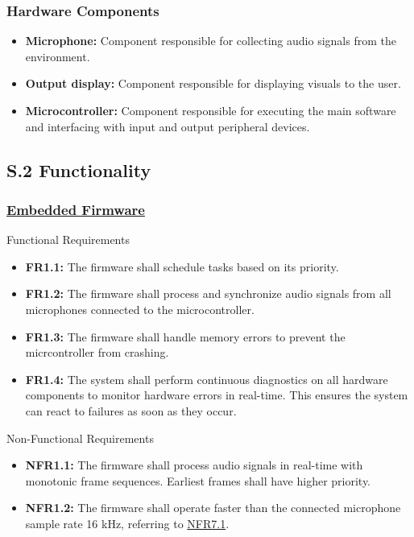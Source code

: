 \documentclass[12pt]{article}
\theoremstyle{definition}
\begin{document}
\subsubsection{Hardware Components}

\begin{itemize}
  \item \textbf{Microphone:}\label{comp:microphone} Component responsible for
  collecting audio signals from the environment.

  \item \textbf{Output display:}\label{comp:display} Component responsible for
  displaying visuals to the user.

  \item \textbf{Microcontroller:} \label{comp:microcontroller} Component
  responsible for executing the main software and interfacing with input and
  output peripheral devices.
\end{itemize}

\subsection{S.2 Functionality} \label{sec:S.2}

\subsubsection{\hyperref[comp:embedded_firmware]{Embedded Firmware}} Functional
Requirements \label{sec:FR1}
\begin{itemize}
  \item \label{FR1_1}\textbf{FR1.1:} The firmware shall schedule tasks based on
  its priority.
  
  \item \label{FR1_2}\textbf{FR1.2:} The firmware shall process and synchronize
  audio signals from all microphones connected to the microcontroller.

  \item \label{FR1_3}\textbf{FR1.3:} The firmware shall handle memory errors to
  prevent the micrcontroller from crashing.

  \item \label{FR1_4}\textbf{FR1.4:} The system shall perform continuous
  diagnostics on all hardware components to monitor hardware errors in
  real-time. This ensures the system can react to failures as soon as they
  occur.
\end{itemize}

Non-Functional Requirements
\begin{itemize}
  \item \label{NFR1_1}\textbf{NFR1.1:} The firmware shall process audio signals
  in real-time with monotonic frame sequences. Earliest frames shall have higher
  priority.
  
  \item \label{NFR1_2}\textbf{NFR1.2:} The firmware shall operate faster than
  the connected microphone sample rate 16 kHz, referring to
  \hyperref[NFR7_1]{NFR7.1}.
\end{itemize}
\end{document}

